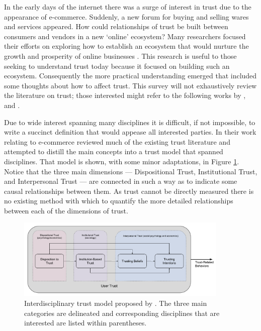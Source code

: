     In the early days of the internet there was a surge of interest in trust due to the appearance of e-commerce. Suddenly, a new forum for buying and selling wares and services appeared. How could relationships of trust be built between consumers and vendors in a new `online' ecosystem? Many researchers focused their efforts on exploring how to establish an ecosystem that would nurture the growth and prosperity of online businesses \cite{McKnight2001-fa}. This research is useful to those seeking to understand trust today because it focused on building such an ecosystem. Consequently the more practical understanding emerged that included some thoughts about how to affect trust. This survey will not exhaustively review the literature on trust; those interested might refer to the following works by \citet{McKnight2001-fa}, and \citet{Lewicki2006-hj}.

    Due to wide interest spanning many disciplines it is difficult, if not impossible, to write a succinct definition that would appease all interested parties. In their work relating to e-commerce \citet{McKnight2001-fa} reviewed much of the existing trust literature and attempted to distill the main concepts into a trust model that spanned disciplines. That model is shown, with some minor adaptations, in Figure \ref{fig:UserTrust}. Notice that the three main dimensions --- Dispositional Trust, Institutional Trust, and Interpersonal Trust --- are connected in such a way as to indicate some causal relationships between them. As trust cannot be directly measured there is no existing method with which to quantify the more detailed relationships between each of the dimensions of trust.

	\begin{figure}[htbp]
    	\centering
     	\includegraphics[width=0.9\textwidth]{Figures/UserTrust}
    	\caption{Interdisciplinary trust model proposed by \citet{McKnight2001-fa}. The three main categories are delineated and corresponding disciplines that are interested are listed within parentheses.}
        \label{fig:UserTrust}
    \end{figure}

